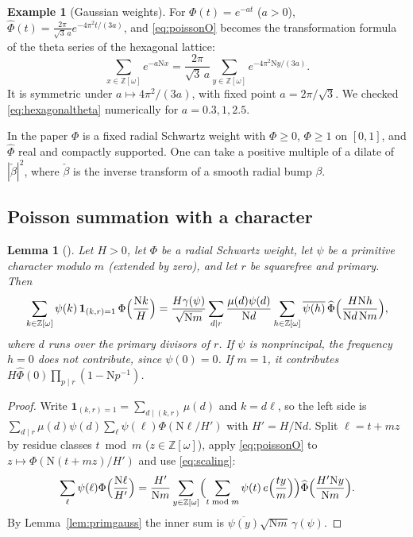 \documentclass[11pt]{article}
\numberwithin{equation}{section}
\newcommand{\N}{\mathrm N}
\newcommand{\OO}{\mathbb Z[\omega]}
\newtheorem{lemma}[theorem]{Lemma}
\theoremstyle{definition}
\newtheorem{example}[theorem]{Example}
\theoremstyle{remark}
\begin{document}
\begin{example}[Gaussian weights]\label{ex:gaussian}
For $\Phi(t)=e^{-at}$ ($a>0$), $\widehat\Phi(t)=\frac{2\pi}{\sqrt3\,a}e^{-4\pi^2t/(3a)}$, and \eqref{eq:poissonO} becomes
the transformation formula of the theta series of the hexagonal lattice:
\begin{equation}\label{eq:hexagonaltheta}
 \sum_{x\in\OO}e^{-a\N x}=\frac{2\pi}{\sqrt3\,a}\sum_{y\in\OO}e^{-4\pi^2\N y/(3a)} .
\end{equation}
It is symmetric under $a\mapsto4\pi^2/(3a)$, with fixed point $a=2\pi/\sqrt3$. We checked
\eqref{eq:hexagonaltheta} numerically for $a=0.3,1,2.5$.
\end{example}

In the paper $\Phi$ is a fixed radial Schwartz weight with $\Phi\ge0$, $\Phi\ge1$ on $[0,1]$, and $\widehat\Phi$
real and compactly supported. One can take a positive multiple of a dilate of $|\check\beta|^2$, where
$\check\beta$ is the inverse transform of a smooth radial bump $\beta$.

\subsection{Poisson summation with a character}\label{sec:poissonchar}
\begin{lemma}[{\cite[Lemma~4.2]{QRH}}]\label{lem:poissonchar}
Let $H>0$, let $\Phi$ be a radial Schwartz weight, let $\psi$ be a primitive character modulo $m$
(extended by zero), and let $r$ be squarefree and primary. Then
\begin{equation}\label{eq:poissonchar}
 \sum_{k\in\OO}\psi(k)\,\mathbf 1_{(k,r)=1}\,\Phi\Bigl(\frac{\N k}H\Bigr)
 =\frac{H\gamma(\psi)}{\sqrt{\N m}}\sum_{d\mid r}\frac{\mu(d)\psi(d)}{\N d}
 \sum_{h\in\OO}\overline{\psi(h)}\,\widehat\Phi\Bigl(\frac{H\N h}{\N d\,\N m}\Bigr),
\end{equation}
where $d$ runs over the primary divisors of $r$. If $\psi$ is nonprincipal, the frequency $h=0$ does not
contribute, since $\psi(0)=0$. If $m=1$, it contributes $H\widehat\Phi(0)\prod_{p\mid r}(1-\N p^{-1})$.
\end{lemma}

\begin{proof}
Write $\mathbf 1_{(k,r)=1}=\sum_{d\mid(k,r)}\mu(d)$ and $k=d\ell$, so the left side is
$\sum_{d\mid r}\mu(d)\psi(d)\sum_\ell\psi(\ell)\Phi(\N\ell/H')$ with $H'=H/\N d$. Split $\ell=t+mz$ by residue classes
$t\bmod m$ ($z\in\OO$), apply \eqref{eq:poissonO} to $z\mapsto\Phi(\N(t+mz)/H')$ and use \eqref{eq:scaling}:
\begin{equation}\label{eq:poissoncharstep}
 \sum_\ell\psi(\ell)\Phi\Bigl(\frac{\N\ell}{H'}\Bigr)=\frac{H'}{\N m}\sum_{y\in\OO}\Bigl(\sum_{t\bmod m}\psi(t)\,e\Bigl(\frac{ty}m\Bigr)\Bigr)
 \widehat\Phi\Bigl(\frac{H'\N y}{\N m}\Bigr).
\end{equation}
By Lemma~\ref{lem:primgauss} the inner sum is $\overline{\psi(y)}\sqrt{\N m}\,\gamma(\psi)$.
\end{proof}
\end{document}

